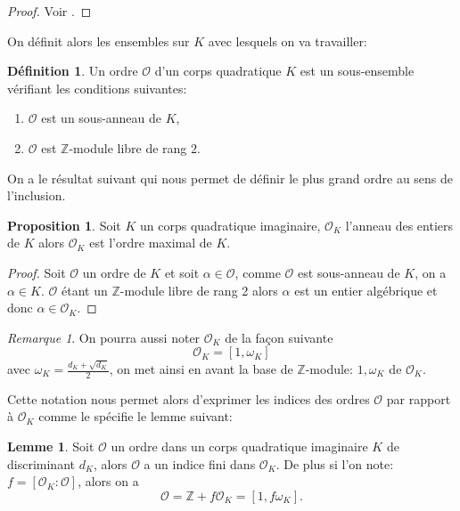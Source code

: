 \documentclass[10pt,a4paper]{book}
\theoremstyle{plain}
\theoremstyle{definition}
\newtheorem{lem}[thm]{Lemme}
\theoremstyle{definition}
\theoremstyle{definition}
\newtheorem{prop}[thm]{Proposition}
\theoremstyle{definition}
\newtheorem{defi}[thm]{Définition}
\theoremstyle{remark}
\newtheorem{rem}[thm]{Remarque}
\theoremstyle{remark}
\theoremstyle{definition}
\begin{document}
\begin{proof}
Voir \cite[exercise 5.7]{Cox89}.
\end{proof}

On définit alors les ensembles sur $K$  avec lesquels on va travailler:

\begin{defi}
Un ordre $\mathcal{O}$ d'un corps quadratique $K$ est un sous-ensemble vérifiant les conditions suivantes: 
\begin{enumerate}
\item $\mathcal{O}$ est un sous-anneau de $K$,
\item $\mathcal{O}$ est $\mathbb{Z}$-module libre de rang $2$.
\end{enumerate} 
\end{defi}

On a le résultat suivant qui nous permet de définir le plus grand ordre au sens de l'inclusion.

\begin{prop}
Soit $K$ un corps quadratique imaginaire, $\mathcal{O}_K$ l'anneau des entiers de $K$ alors $\mathcal{O}_K$ est l'ordre maximal de $K$.
\end{prop}

\begin{proof}
Soit $\mathcal{O}$ un ordre de $K$ et soit $\alpha \in \mathcal{O}$, comme $\mathcal{O}$ est sous-anneau de $K$, on a $\alpha \in K$. $\mathcal{O}$ étant un $\mathbb{Z}$-module libre de rang 2 alors $\alpha$ est un entier algébrique et donc $\alpha \in \mathcal{O}_K$.
\end{proof}


\begin{rem}
On pourra aussi noter $\mathcal{O}_K$ de la façon suivante 
\[ \mathcal{O}_K =[1, \omega_K] \]
avec $\omega_K = \frac{d_K+\sqrt{d_K}}{2} $, on met ainsi en avant la base de $\mathbb{Z}$-module: $1, \omega_K$ de $\mathcal{O}_K$.
\end{rem}

Cette notation nous permet alors d'exprimer les indices des ordres $\mathcal{O}$ par rapport à $\mathcal{O}_K$ comme le spécifie le lemme suivant:

\begin{lem}
Soit $\mathcal{O}$ un ordre dans un corps quadratique imaginaire $K$ de discriminant $d_K$, alors $\mathcal{O}$ a un indice fini dans $\mathcal{O}_K$. De plus si l'on note: $f= [\mathcal{O}_K : \mathcal{O}]$, alors on a 
\[ \mathcal{O} = \mathbb{Z} + f\mathcal{O}_K = [1, f\omega_K]. \]
\end{lem}
\end{document}
